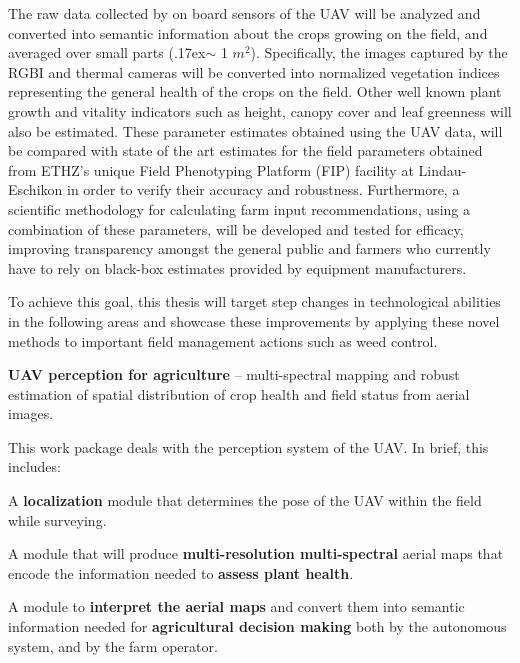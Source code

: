  The raw data collected by on board sensors of the UAV will be analyzed and converted into semantic information about the crops growing on the field, and averaged over small parts ({\raise.17ex\hbox{$\scriptstyle\sim$}} 1 $m^2$). Specifically, the images captured by the RGBI and thermal cameras will be converted into normalized vegetation indices representing the general health of the crops on the field. Other well known plant growth and vitality indicators such as height, canopy cover and leaf greenness will also be estimated. These parameter estimates obtained using the UAV data, will be compared with state of the art estimates for the field parameters obtained from ETHZ's unique Field Phenotyping Platform (FIP) facility at Lindau-Eschikon in order to verify their accuracy and robustness. Furthermore, a scientific methodology for calculating farm input recommendations, using a combination of these parameters, will be developed and tested for efficacy, improving transparency amongst the general public and farmers who currently have to rely on black-box estimates provided by equipment manufacturers.


\iffalse


 


To achieve this goal, this thesis will target step changes in technological abilities in the following areas and showcase these improvements by applying these novel methods to important field management actions such as weed control.
\begin{denseItemize}
\item {\bf UAV perception for agriculture} -- multi-spectral mapping and robust estimation of spatial distribution of crop health and field status from aerial images.
\end{denseItemize}

This work package deals with the perception system of the UAV. In brief, this includes:
\begin{denseItemize}
\item A {\bf localization} module that determines the pose of the UAV within the field while surveying.
\item A module that will produce {\bf multi-resolution multi-spectral} aerial maps that encode the information needed to {\bf assess plant health}.
\item A module to {\bf interpret the aerial maps} and convert them into semantic information needed for {\bf agricultural decision making} both by the autonomous system, and by the farm operator.
\end{denseItemize}


